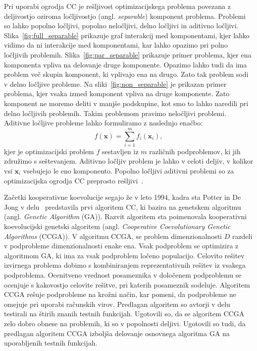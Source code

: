 Pri uporabi ogrodja CC je rešljivost optimizacijskega problema povezana z deljivostjo oziroma ločljivostjo (angl. \textit{separable}) komponent problema.
Problemi so lahko popolno ločljivi, popolno neločljivi, delno ločljivi in aditivno ločljivi.
Slika~\ref{fig:full_separable} prikazuje graf interakcij med komponentami, kjer lahko vidimo da ni interakcije med komponentami, kar lahko opazimo pri polno ločljivih problemih.
Slika~\ref{fig:par_separable} prikazuje primer problema, kjer ena komponenta vpliva na delovanje druge komponente.
Opazimo lahko tudi da ima problem več skupin komponent, ki vplivajo ena na drugo.
Zato tak problem sodi v delno ločljive probleme.
Na sliki~\ref{fig:non_separable} je prikazan primer problema, kjer vsaka izmed komponent vpliva na druge komponente.
Zato komponent ne moremo deliti v manjše podskupine, kot smo to lahko naredili pri delno ločljivih problemih.
Takim problemom pravimo neločljivi problemi.
Aditivne ločljive probleme lahko formuliramo z naslednjo enačbo:
\begin{equation}
    f (\mathbf{x}) = \sum_{i=1}^{\mathit{m}} f_i(\mathbf{x}_i) \label{eq:additivly_separable},
\end{equation}
kjer je optimizacijski problem $f$ sestavljen iz $m$ različnih podproblemov, ki jih združimo s seštevanjem.
Aditivno ločljiv problem je lahko v celoti deljiv, v kolikor vsi $\mathbf{x}_i$ vsebujejo le eno komponento.
Popolno ločljivi aditivni problemi so za optimizacijska ogrodja CC preprosto rešljivi~\cite{alg:dg}.

Začetki kooperativne koevolucije segajo že v leto 1994, kadra sta Potter in De Jong v delu~\cite{alg:ccga} predstavila prvi algoritem CC, ki bazira na genetskem algoritmu (angl. \textit{Genetic Algorithm} (GA)).
Razvit algoritem sta poimenovala kooperativni koevolucijski genetski algoritem (angl. \textit{Cooperative Coevolutionary Genetic Algorithms} (CCGA)).
V algoritmu CCGA, se problem dimenzionalnosti $\mathit{D}$ razdeli v podprobleme dimenzionalnosti enake ena.
Vsak podproblem se optimizira z algoritmom GA, ki ima za vsak podproblem ločeno populacijo.
Celovito rešitev izvirnega problema dobimo s kombiniranjem reprezentativnih rešitev iz vsakega podproblema.
Ocenitveno vrednost posameznika v določenem podproblemu se ocenjuje s kakovostjo celovite rešitve, pri katerih posameznik sodeluje.
Algoritem CCGA rešuje podprobleme na krožni način, kar pomeni, da podprobleme ne omejuje pri uporabi računskih virov.
Predlagan algoritem so avtorji v delu testirali na štirih znanih testnih funkcijah.
Ugotovili so, da se algoritem CCGA zelo dobro obnese na problemih, ki so v popolnosti deljivi.
Ugotovili so tudi, da predlagan algoritem CCGA izboljša delovanje osnovnega algoritma GA na uporabljenih testnih funkcijah.

